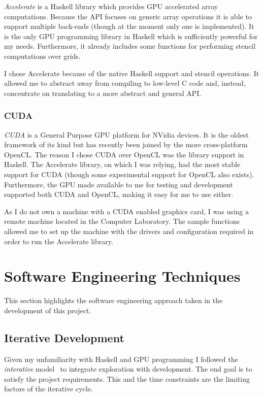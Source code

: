 \documentclass[12pt,a4paper,twoside]{scrbook}
\begin{document}
\emph{Accelerate} is a Haskell library which provides GPU accelerated array
computations. Because the API focuses on generic array operations it is able to
support multiple back-ends (though at the moment only one is implemented). It is
the only GPU programming library in Haskell which is sufficiently powerful for
my needs. Furthermore, it already includes some functions for performing stencil
computations over grids.

I chose Accelerate because of the native Haskell support and stencil
operations. It allowed me to abstract away from compiling to low-level C code
and, instead, concentrate on translating to a more abstract and general API.

\subsubsection{CUDA}

\emph{CUDA} is a General Purpose GPU platform for NVidia devices\cite{cuda}. It
is the oldest framework of its kind but has recently been joined by the more
cross-platform OpenCL. The reason I chose CUDA over OpenCL was the library
support in Haskell. The Accelerate library, on which I was relying, had the most
stable support for CUDA (though some experimental support for OpenCL also
exists). Furthermore, the GPU made available to me for testing and development
supported both CUDA and OpenCL, making it easy for me to use either.

As I do not own a machine with a CUDA enabled graphics card, I was using a
remote machine located in the Computer Laboratory. The sample functions allowed
me to set up the machine with the drivers and configuration required in order to
run the Accelerate library.

\section{Software Engineering Techniques}

This section highlights the software engineering approach taken in the
development of this project.

\subsection{Iterative Development}
\label{sec:iterdev}

Given my unfamiliarity with Haskell and GPU programming I followed the
\emph{interative} model~\cite{cockburn08} to integrate exploration with
development. The end goal is to satisfy the project requirements. This and the
time constraints are the limiting factors of the iterative cycle.
\end{document}
